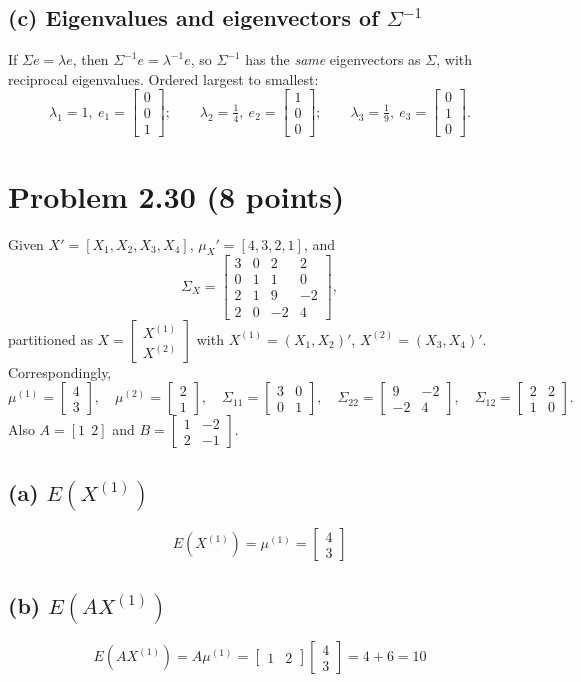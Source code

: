 \documentclass[11pt]{article}
\newcommand{\mat}[1]{\begin{bmatrix} #1 \end{bmatrix}}
\begin{document}
\subsection*{(c) Eigenvalues and eigenvectors of $\Sigma^{-1}$}
If $\Sigma e = \lambda e$, then $\Sigma^{-1}e = \lambda^{-1}e$, so $\Sigma^{-1}$ has the \emph{same} eigenvectors as $\Sigma$, with reciprocal eigenvalues. Ordered largest to smallest:
\[
\lambda_1 = 1,\ e_1 = \mat{0\\0\\1}; \qquad
\lambda_2 = \tfrac14,\ e_2 = \mat{1\\0\\0}; \qquad
\lambda_3 = \tfrac19,\ e_3 = \mat{0\\1\\0}.
\]

\section*{Problem 2.30 (8 points)}

Given $X' = [X_1,X_2,X_3,X_4]$, $\mu_X' = [4,3,2,1]$, and
\[
\Sigma_X = \mat{3&0&2&2\\0&1&1&0\\2&1&9&-2\\2&0&-2&4},
\]
partitioned as $X = \mat{X^{(1)}\\X^{(2)}}$ with $X^{(1)} = (X_1,X_2)'$, $X^{(2)}=(X_3,X_4)'$. Correspondingly,
\[
\mu^{(1)} = \mat{4\\3}, \quad \mu^{(2)} = \mat{2\\1}, \quad
\Sigma_{11} = \mat{3&0\\0&1}, \quad
\Sigma_{22} = \mat{9&-2\\-2&4}, \quad
\Sigma_{12} = \mat{2&2\\1&0}.
\]
Also $A = [1\ \ 2]$ and $B = \mat{1&-2\\2&-1}$.

\subsection*{(a) $E(X^{(1)})$}
\[
E(X^{(1)}) = \mu^{(1)} = \mat{4\\3}
\]

\subsection*{(b) $E(AX^{(1)})$}
\[
E(AX^{(1)}) = A\mu^{(1)} = \mat{1 & 2}\mat{4\\3} = 4+6 = 10
\]
\end{document}
